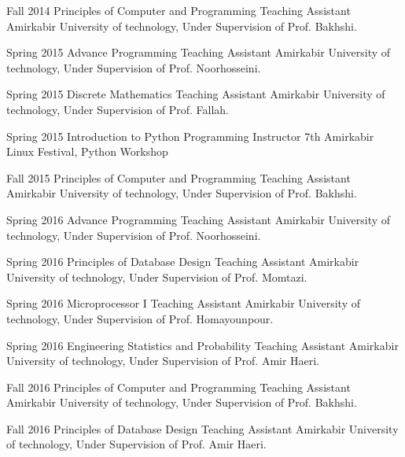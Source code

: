 \documentclass[]{friggeri-cv} %
\begin{document}
\begin{entrylist}

	\entry
	{Fall 2014}
	{Principles of Computer and Programming}
	{Teaching Assistant}
	{Amirkabir University of technology, Under Supervision of Prof. Bakhshi.}


	\entry
	{Spring 2015}
	{Advance Programming}
	{Teaching Assistant}
	{Amirkabir University of technology, Under Supervision of Prof. Noorhosseini.}


	\entry
	{Spring 2015}
	{Discrete Mathematics}
	{Teaching Assistant}
	{Amirkabir University of technology, Under Supervision of Prof. Fallah.}


	\entry
	{Spring 2015}
	{Introduction to Python Programming}
	{Instructor}
	{7th Amirkabir Linux Festival, Python Workshop}


	\entry
	{Fall 2015}
	{Principles of Computer and Programming}
	{Teaching Assistant}
	{Amirkabir University of technology, Under Supervision of Prof. Bakhshi.}


	\entry
	{Spring 2016}
	{Advance Programming}
	{Teaching Assistant}
	{Amirkabir University of technology, Under Supervision of Prof. Noorhosseini.}


	\entry
	{Spring 2016}
	{Principles of Database Design}
	{Teaching Assistant}
	{Amirkabir University of technology, Under Supervision of Prof. Momtazi.}


	\entry
	{Spring 2016}
	{Microprocessor I}
	{Teaching Assistant}
	{Amirkabir University of technology, Under Supervision of Prof. Homayounpour.}


	\entry
	{Spring 2016}
	{Engineering Statistics and Probability}
	{Teaching Assistant}
	{Amirkabir University of technology, Under Supervision of Prof. Amir Haeri.}


	\entry
	{Fall 2016}
	{Principles of Computer and Programming}
	{Teaching Assistant}
	{Amirkabir University of technology, Under Supervision of Prof. Bakhshi.}


	\entry
	{Fall 2016}
	{Principles of Database Design}
	{Teaching Assistant}
	{Amirkabir University of technology, Under Supervision of Prof. Amir Haeri.}


\end{entrylist}
\end{document}
